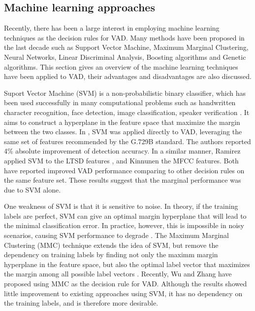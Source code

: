 \subsection{Machine learning approaches}

Recently, there has been a large interest in employing machine learning techniques as the decision rules for VAD. Many methods have been proposed in the last decade such as Support Vector Machine, Maximum Marginal Clustering, Neural Networks, Linear Discriminal Analysis, Boosting algorithms and Genetic algorithms. This section gives an overview of the machine learning techniques have been applied to VAD, their advantages and disadvantages are also discussed.

Suport Vector Machine (SVM) is a non-probabilistic binary classifier, which has been used successfully in many computational problems such as handwritten character recognition, face detection, image classification, speaker verification \cite{duda2001pattern}. It aims to construct a hyperplane in the feature space that maximize the margin between the two classes. In \cite{enqing2003applying}, SVM was applied directly to VAD, leveraging the same set of features recommended by the G.729B standard. The authors reported 4\% absolute improvement of detection accuracy. In a similar manner, Ramirez \etal \cite{ramirez2006svm,ramirez2006speech_svm} applied SVM to the LTSD features \cite{ramirez2004efficient}, and Kinnunen \etal \cite{kinnunen2007voice} the MFCC features. Both have reported improved VAD performance comparing to other decision rules on the same feature set. These results suggest that the marginal performance was due to SVM alone.

One weakness of SVM is that it is sensitive to noise. In theory, if the training labels are perfect, SVM can give an optimal margin hyperplane that will lead to the minimal classification error. In practice, however, this is impossible in noisy scenarios, causing SVM performance to degrade \cite{wu2011maximum}.
The Maximum Marginal Clustering (MMC) technique \cite{xu2005maximum,wang2010linear} extends the idea of SVM, but remove the dependency on training labels by finding not only the maximm margin hyperplane in the feature space, but also the optimal label vector that maximizes the margin among all possible label vectors \cite{xu2005maximum}. Recently, Wu and Zhang \cite{wu2011maximum} have proposed using MMC as the decision rule for VAD. Although the results showed little improvement to existing approaches using SVM, it has no dependency on the training labels, and is therefore more desirable.

